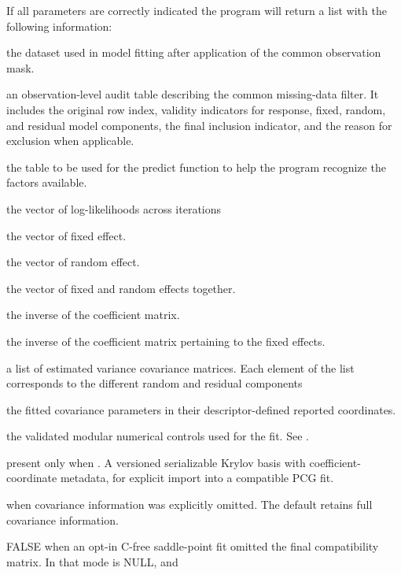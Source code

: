 \documentclass[a4paper]{book}
\begin{document}
%
\begin{Value}
If all parameters are correctly indicated the program will return a list with the following information:

\begin{ldescription}
\item[\code{data}] the dataset used in model fitting after application of the common
observation mask.
\item[\code{obsInfo}] an observation-level audit table describing the common missing-data
filter. It includes the original row index, validity indicators for
response, fixed, random, and residual model components, the final
inclusion indicator, and the reason for exclusion when applicable.
\item[\code{Dtable}] the table to be used for the predict function to help the program
recognize the factors available.
\item[\code{llik}] the vector of log-likelihoods across iterations
\item[\code{b}] the vector of fixed effect.
\item[\code{u}] the vector of random effect.
\item[\code{bu}] the vector of fixed and random effects together.
\item[\code{Ci}] the inverse of the coefficient matrix.
\item[\code{Ci\_11}] the inverse of the coefficient matrix pertaining to the fixed effects.
\item[\code{theta}] a list of estimated variance covariance matrices. Each element of 
the list corresponds to the different random and residual components
\item[\code{covPar}] the fitted covariance parameters in their descriptor-defined
reported coordinates.
\item[\code{control}] the validated modular numerical controls used for the fit.
See .
\item[\code{pcgRecycleState}] present only when .
A versioned serializable Krylov basis with coefficient-coordinate metadata,
for explicit import into a compatible PCG fit.
\item[\code{covarianceInformation}]  when covariance information was
explicitly omitted. The default retains full covariance information.
\item[\code{retainCoefficientMatrix}] FALSE when an opt-in C-free saddle-point fit
omitted the final compatibility matrix. In that mode  is NULL, and

\end{ldescription}
\end{Value}
\end{document}
